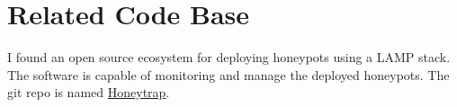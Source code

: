 \documentclass[journal]{IEEEtran}
\begin{document}
    \section{Related Code Base}
    \label{sec:code}
        I found an open source ecosystem for deploying honeypots using a LAMP stack.
        The software is capable of monitoring and manage the deployed honeypots.
        The git repo is named \href{https://github.com/honeytrap/honeytrap}{Honeytrap}.


    
    

    \flushend
\end{document}

